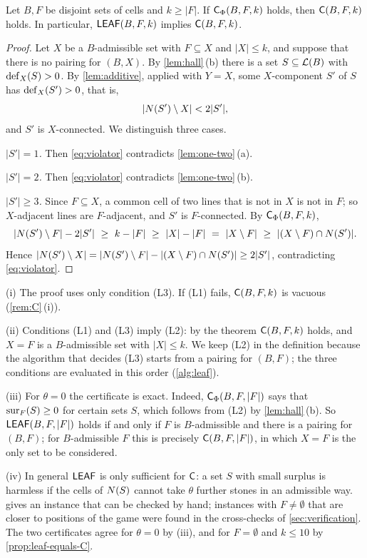\begin{theorem}\label{thm:leaf-implies-C}
Let $B,F$ be disjoint sets of cells and $k\ge|F|$. If $\mathsf{C}_\Phi(B,F,k)$ holds, then $\mathsf{C}(B,F,k)$ holds. In
particular, $\mathsf{LEAF}(B,F,k)$ implies $\mathsf{C}(B,F,k)$.
\end{theorem}

\begin{proof}
Let $X$ be a $B$-admissible set with $F\subseteq X$ and $|X|\le k$, and suppose that there is no pairing for
$(B,X)$. By \cref{lem:hall}\,(b) there is a set $S\subseteq\mathcal{L}(B)$ with $\operatorname{def}_X(S)>0$. By
\cref{lem:additive}, applied with $Y=X$, some $X$-component $S'$ of $S$ has $\operatorname{def}_X(S')>0$, that is,
\begin{equation}\label{eq:violator}
  |N(S')\setminus X|<2|S'| ,
\end{equation}
and $S'$ is $X$-connected. We distinguish three cases.

\emph{$|S'|=1$.} Then \eqref{eq:violator} contradicts \cref{lem:one-two}\,(a).

\emph{$|S'|=2$.} Then \eqref{eq:violator} contradicts \cref{lem:one-two}\,(b).

\emph{$|S'|\ge 3$.} Since $F\subseteq X$, a common cell of two lines that is not in $X$ is not in $F$; so
$X$-adjacent lines are $F$-adjacent, and $S'$ is $F$-connected. By $\mathsf{C}_\Phi(B,F,k)$,
\[
  |\N(S')\setminus F|-2|S'|\ \ge\ k-|F|\ \ge\ |X|-|F|\ =\ |X\setminus F|\ \ge\ |(X\setminus F)\cap\N(S')| .
\]
Hence $|N(S')\setminus X|=|N(S')\setminus F|-|(X\setminus F)\cap N(S')|\ge 2|S'|$, contradicting
\eqref{eq:violator}.
\end{proof}

\begin{remark}\label{rem:leaf}
(i) The proof uses only condition (L3). If (L1) fails, $\mathsf{C}(B,F,k)$ is vacuous (\cref{rem:C}\,(i)).

(ii) Conditions (L1) and (L3) imply (L2): by the theorem $\mathsf{C}(B,F,k)$ holds, and $X=F$ is a $B$-admissible
set with $|X|\le k$. We keep (L2) in the definition because the algorithm that decides (L3) starts from a
pairing for $(B,F)$; the three conditions are evaluated in this order (\cref{alg:leaf}).

(iii) For $\theta=0$ the certificate is exact. Indeed, $\mathsf{C}_\Phi(B,F,|F|)$ says that $\operatorname{sur}_F(S)\ge 0$ for
certain sets $S$, which follows from (L2) by \cref{lem:hall}\,(b). So $\mathsf{LEAF}(B,F,|F|)$ holds if and only if
$F$ is $B$-admissible and there is a pairing for $(B,F)$; for $B$-admissible $F$ this is precisely
$\mathsf{C}(B,F,|F|)$, in which $X=F$ is the only set to be considered.

(iv) In general $\mathsf{LEAF}$ is only sufficient for $\mathsf{C}$: a set $S$ with small surplus is harmless if the
cells of $N(S)$ cannot take $\theta$ further stones in an admissible way.  gives an
instance that can be checked by hand; instances with $F\ne\emptyset$ that are closer to positions of the
game were found in the cross-checks of \cref{sec:verification}. The two certificates agree for $\theta=0$
by (iii), and for $F=\emptyset$ and $k\le 10$ by \cref{prop:leaf-equals-C}.
\end{remark}

